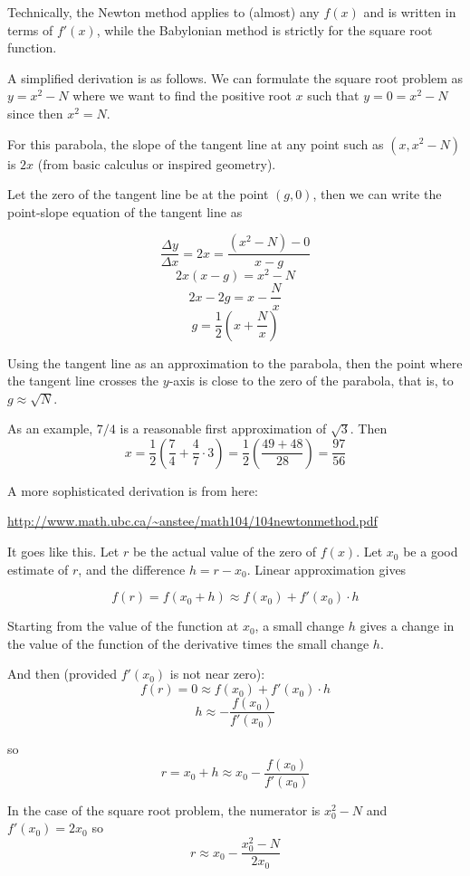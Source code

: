 \documentclass[11pt, oneside]{article}
\begin{document}
Technically, the Newton method applies to (almost) any $f(x)$ and is written in terms of $f'(x)$, while the Babylonian method is strictly for the square root function.

A simplified derivation is as follows.  We can formulate the square root problem as $y = x^2 - N$ where we want to find the positive root $x$ such that $y = 0 = x^2 - N$ since then $x^2 = N$.  

For this parabola, the slope of the tangent line at any point such as $(x, x^2-N)$ is $2x$ (from basic calculus or inspired geometry).  

Let the zero of the tangent line be at the point $(g,0)$, then we can write the point-slope equation of the tangent line as

\[ \frac{\Delta y}{\Delta x} = 2x = \frac{(x^2 - N) - 0}{x - g} \]
\[ 2x(x - g) = x^2 - N \]
\[ 2x - 2g = x - \frac{N}{x} \]
\[ g = \frac{1}{2} (x + \frac{N}{x}) \]

Using the tangent line as an approximation to the parabola, then the point where the tangent line crosses the $y$-axis is close to the zero of the parabola, that is, to $g \approx \sqrt{N}$.

As an example, $7/4$ is a reasonable first approximation of $\sqrt{3}$.  Then
\[ x = \frac{1}{2} (\frac{7}{4} + \frac{4}{7} \cdot 3) = \frac{1}{2} (\frac{49 + 48}{28})  = \frac{97}{56} \]

A more sophisticated derivation is from here:

\url{http://www.math.ubc.ca/~anstee/math104/104newtonmethod.pdf}

It goes like this.  Let $r$ be the actual value of the zero of $f(x)$.  Let $x_0$ be a good estimate of $r$, and the difference $h = r - x_0$.  Linear approximation gives

\[ f(r) = f(x_0 + h) \approx f(x_0) + f'(x_0) \cdot h \]

Starting from the value of the function at $x_0$, a small change $h$ gives a change in the value of the function of the derivative times the small change $h$.

And then (provided $f'(x_0)$ is not near zero):
\[ f(r) = 0  \approx f(x_0) + f'(x_0) \cdot h \] 
\[ h \approx -\frac{f(x_0)}{f'(x_0)} \]

so
\[ r = x_0 + h \approx x_0 -\frac{f(x_0)}{f'(x_0)} \]

In the case of the square root problem, the numerator is $ x_0^2 - N$ and $f'(x_0) = 2x_0$ so
\[ r \approx x_0 -\frac{x_0^2 - N}{2x_0} \]
\end{document}
